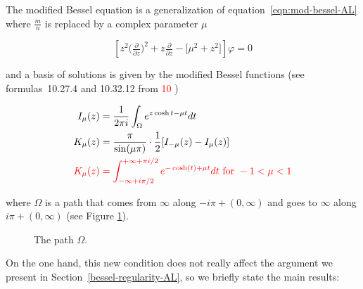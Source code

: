 \documentclass{article}
\let\Re\relax
\DeclareMathOperator{\Re}{Re}
\theoremstyle{definition}
\begin{document}
The modified Bessel equation is a generalization of equation~\eqref{eqn:mod-bessel-AL} where $\frac{m}{n}$ is replaced by a complex parameter $\mu$

\begin{equation}\label{eqn:mod-bessel}
\left[z^2 \big(\tfrac{\partial}{\partial z}\big)^2 + z \tfrac{\partial}{\partial z} - \big[\mu^2 + z^2\big]\right] \varphi = 0
\end{equation}

and a basis of solutions is given by the modified Bessel functions (see formulas~10.27.4 and 10.32.12 from \cite{dlmf} \textcolor{red}{10 \cite{watson1922treatise}}) 

\begin{align*}
I_{\mu}(z)&=\frac{1}{2\pi i}\int_{\Omega} e^{z\cosh t - \mu t} dt \\
K_{\mu}(z)&=\frac{\pi}{\sin(\mu \pi)}\cdot \frac{1}{2}[ I_{-\mu}(z) - I_{\mu}(z)]\\
\color{red}K_{\mu}(z)& \color{red}=\int_{-\infty+i\pi/2}^{+\infty+\pi i/2} e^{-\cosh(t)+\mu t} dt \text{  for } -1<\Re \mu<1
\end{align*} 

where $\Omega$ is a path that comes from $\infty$ along $-i \pi + (0, \infty)$ and goes to $\infty$ along $i \pi + (0, \infty)$ (see Figure \ref{fig:Omega_path}).

\begin{figure}[h]
\center
{}
\caption{The path $\Omega$. }\label{fig:Omega_path}
\end{figure}

On the one hand, this new condition does not really affect the argument we present in Section~\ref{bessel-regularity-AL}, so we briefly state the main results: 
\end{document}
